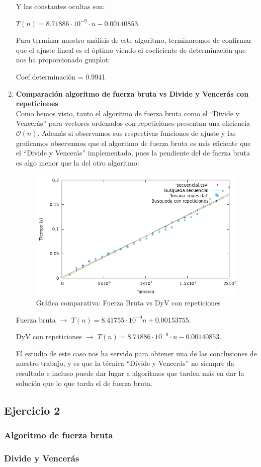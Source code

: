 \documentclass[10pt,a4paper]{article}
\begin{document}
\begin{enumerate}
Y las constantes ocultas son:

\( T(n) = 8.71886 \cdot 10^{-9} \cdot n -0.00140853 \).

Para terminar nuestro análisis de este algoritmo, terminaremos de confirmar que el ajuste lineal es el óptimo viendo el coeficiente de determinación que nos ha proporcionado gnuplot:

Coef.determinación = 0.9941

\item \textbf{Comparación algoritmo de fuerza bruta vs Divide y Vencerás con repeticiones}\\

Como hemos visto, tanto el algoritmo de fuerza bruta como el ``Divide y Vencerás'' para vectores ordenados con repeticiones presentan una eficiencia $\mathcal{O}(n)$. Además si observamos sus respectivas funciones de ajuste y las graficamos observamos que el algoritmo de fuerza bruta es más eficiente que el ``Divide y Vencerás'' implementado, pues la pendiente del de fuerza bruta es algo menor que la del otro algoritmo:

\begin{figure}[h!]
	\centering
	\includegraphics[scale=0.55]{./Images/Grafica_secvsrep.png}
	\caption{Gráfica comparativa: Fuerza Bruta vs DyV con repeticiones}
\end{figure}


Fuerza bruta $\longrightarrow$ \( T(n) = 8.41755 \cdot 10^{-9} n + 0.00153755\).

DyV con repeticiones $\longrightarrow$ \( T(n) = 8.71886 \cdot 10^{-9} \cdot n -0.00140853 \).

El estudio de este caso nos ha servido para obtener una de las conclusiones de nuestro trabajo, y es que la técnica ``Divide y Vencerás'' no siempre da resultado e incluso puede dar lugar a algoritmos que tarden más en dar la solución que lo que tarda el de fuerza bruta.

\end{enumerate}



\subsection{Ejercicio 2}

\subsubsection{Algoritmo de fuerza bruta}

\subsubsection{Divide y Vencerás}
\end{document}
